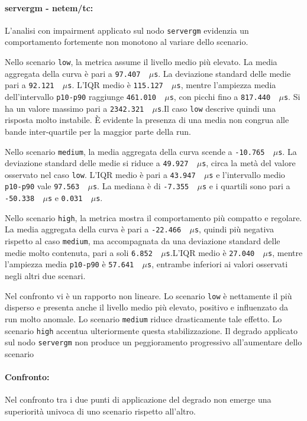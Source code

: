 \paragraph*{servergm - netem/tc:}
L'analisi con impairment applicato sul nodo \texttt{servergm} evidenzia un
comportamento fortemente non monotono al variare dello scenario.

Nello scenario \texttt{low}, la metrica assume il livello medio più elevato. La media
aggregata della curva è pari a \texttt{97.407 \,$\mu$s}. La deviazione standard delle
medie pari a \texttt{92.121 \,$\mu$s}. L'IQR medio è \texttt{115.127 \,$\mu$s}, mentre
l'ampiezza media dell'intervallo \texttt{p10-p90} raggiunge \texttt{461.010 \,$\mu$s},
con picchi fino a \texttt{817.440 \,$\mu$s}. Si ha un valore massimo pari a
\texttt{2342.321 \,$\mu$s}.Il caso \texttt{low} descrive quindi una risposta
molto instabile. È evidente la presenza di una media non congrua alle bande inter-quartile
per la maggior parte della run.

Nello scenario \texttt{medium}, la media aggregata della curva scende a \texttt{-10.765
\,$\mu$s}. La deviazione standard delle medie si riduce a \texttt{49.927 \,$\mu$s},
circa la metà del valore osservato nel caso \texttt{low}. L'IQR medio è pari a
\texttt{43.947 \,$\mu$s} e l'intervallo medio \texttt{p10-p90} vale \texttt{97.563
\,$\mu$s}. La mediana è di \texttt{-7.355 \,$\mu$s} e i quartili sono pari a \texttt{-50.338
\,$\mu$s} e \texttt{0.031 \,$\mu$s}.

Nello scenario \texttt{high}, la metrica mostra il comportamento più compatto e regolare.
La media aggregata della curva è pari a \texttt{-22.466 \,$\mu$s}, quindi più
negativa rispetto al caso \texttt{medium}, ma accompagnata da una deviazione
standard delle medie molto contenuta, pari a soli \texttt{6.852 \,$\mu$s}.L'IQR
medio è \texttt{27.040 \,$\mu$s}, mentre l'ampiezza media \texttt{p10-p90} è \texttt{57.641
\,$\mu$s}, entrambe inferiori ai valori osservati negli altri due scenari.

Nel confronto vi è un rapporto non lineare. Lo scenario \texttt{low} è nettamente
il più disperso e presenta anche il livello medio più elevato, positivo e
influenzato da run molto anomale. Lo scenario \texttt{medium} riduce
drasticamente tale effetto. Lo scenario \texttt{high} accentua ulteriormente
questa stabilizzazione. Il degrado applicato sul nodo \texttt{servergm} non
produce un peggioramento progressivo all'aumentare dello scenario

\paragraph*{Confronto:}
Nel confronto tra i due punti di applicazione del degrado non emerge una
superiorità univoca di uno scenario rispetto all'altro.